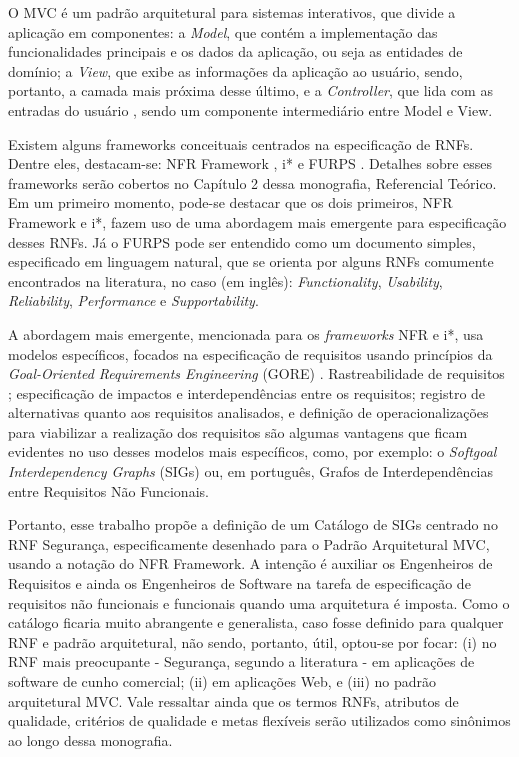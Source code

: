 O MVC é um padrão arquitetural para sistemas interativos, que divide a aplicação em componentes: a \textit{Model}, que contém a implementação das funcionalidades principais e os dados da aplicação, ou seja as entidades de domínio; a \textit{View}, que exibe as informações da aplicação ao usuário, sendo, portanto, a camada mais próxima desse último, e a \textit{Controller}, que lida com as entradas do usuário \cite{buschmann1996system}, sendo um componente intermediário entre Model e View.  

Existem alguns frameworks conceituais centrados na especificação de RNFs. Dentre eles, destacam-se: NFR Framework \cite{chung2009non}, i* \cite{istarwiki20} e FURPS \cite{umar2011analyzing}. Detalhes sobre esses frameworks serão cobertos no Capítulo 2 dessa monografia, Referencial Teórico. Em um primeiro momento, pode-se destacar que os dois primeiros, NFR Framework e i*, fazem uso de uma abordagem mais emergente para especificação desses RNFs. Já o FURPS pode ser entendido como um documento simples, especificado em linguagem natural, que se orienta por alguns RNFs comumente encontrados na literatura, no caso (em inglês): \textit{Functionality}, \textit{Usability}, \textit{Reliability}, \textit{Performance} e \textit{Supportability}.

A abordagem mais emergente, mencionada para os \textit{frameworks} NFR e i*, usa modelos específicos, focados na especificação de requisitos usando princípios da \textit{Goal-Oriented Requirements Engineering} (GORE) \cite{horkoff2016goal}. Rastreabilidade de requisitos \cite{wiegers2013software}; especificação de impactos e interdependências entre os requisitos; registro de alternativas quanto aos requisitos analisados, e definição de operacionalizações para viabilizar a realização dos requisitos são algumas vantagens que ficam evidentes no uso desses modelos mais específicos, como, por exemplo: o \textit{Softgoal Interdependency Graphs} (SIGs) \cite{chung2012non} ou, em português, Grafos de Interdependências entre Requisitos Não Funcionais. 

Portanto, esse trabalho propõe a definição de um Catálogo de SIGs centrado no RNF Segurança, especificamente desenhado para o Padrão Arquitetural MVC, usando a notação do NFR Framework. A intenção é auxiliar os Engenheiros de Requisitos e ainda os Engenheiros de Software na tarefa de especificação de requisitos não funcionais e funcionais quando uma arquitetura é imposta. Como o catálogo ficaria muito abrangente e generalista, caso fosse definido para qualquer RNF e padrão arquitetural, não sendo, portanto, útil, optou-se por focar: (i) no RNF mais preocupante - Segurança, segundo a literatura - em aplicações de software de cunho comercial; (ii) em aplicações Web, e (iii) no padrão arquitetural MVC.  Vale ressaltar ainda que os termos RNFs, atributos de qualidade, critérios de qualidade e metas flexíveis serão utilizados como sinônimos ao longo dessa monografia.


